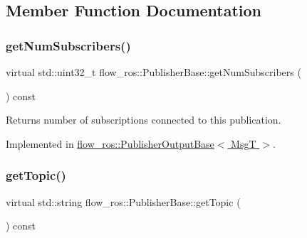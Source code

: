 \subsection{Member Function Documentation}
\mbox{\label{classflow__ros_1_1_publisher_base_ae5638184ee60bbc1326a5e7b47919bec}} 
\subsubsection{\texorpdfstring{get\+Num\+Subscribers()}{getNumSubscribers()}}
{\footnotesize\ttfamily virtual std\+::uint32\+\_\+t flow\+\_\+ros\+::\+Publisher\+Base\+::get\+Num\+Subscribers (\begin{DoxyParamCaption}{ }\end{DoxyParamCaption}) const\hspace{0.3cm}{\ttfamily [pure virtual]}}



Returns number of subscriptions connected to this publication. 



Implemented in \hyperlink{classflow__ros_1_1_publisher_output_base_a8f51f3d329d65aad7d0f9ea6b4f3c4b6}{flow\+\_\+ros\+::\+Publisher\+Output\+Base$<$ Msg\+T $>$}.

\mbox{\label{classflow__ros_1_1_publisher_base_aed36dfd3c58ff3c588b2030319cd26e1}} 
\subsubsection{\texorpdfstring{get\+Topic()}{getTopic()}}
{\footnotesize\ttfamily virtual std\+::string flow\+\_\+ros\+::\+Publisher\+Base\+::get\+Topic (\begin{DoxyParamCaption}{ }\end{DoxyParamCaption}) const\hspace{0.3cm}{\ttfamily [pure virtual]}}



